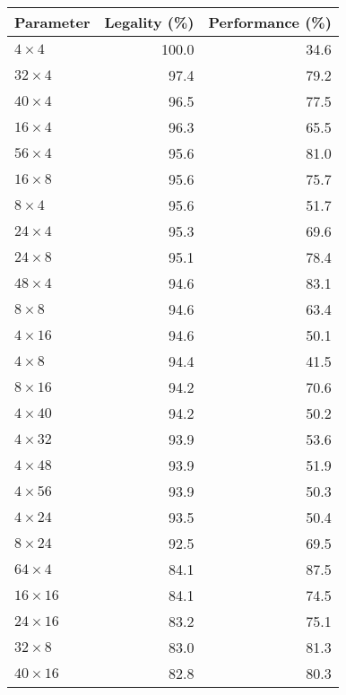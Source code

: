 \begin{tabular}{lrr}
  \toprule
  Parameter & Legality (\%) & Performance (\%) \\
  \midrule
  $4 \times 4$ & 100.0 & 34.6 \\
  $32 \times 4$ & 97.4 & 79.2 \\
  $40 \times 4$ & 96.5 & 77.5 \\
  $16 \times 4$ & 96.3 & 65.5 \\
  $56 \times 4$ & 95.6 & 81.0 \\
  $16 \times 8$ & 95.6 & 75.7 \\
  $8 \times 4$ & 95.6 & 51.7 \\
  $24 \times 4$ & 95.3 & 69.6 \\
  $24 \times 8$ & 95.1 & 78.4 \\
  $48 \times 4$ & 94.6 & 83.1 \\
  $8 \times 8$ & 94.6 & 63.4 \\
  $4 \times 16$ & 94.6 & 50.1 \\
  $4 \times 8$ & 94.4 & 41.5 \\
  $8 \times 16$ & 94.2 & 70.6 \\
  $4 \times 40$ & 94.2 & 50.2 \\
  $4 \times 32$ & 93.9 & 53.6 \\
  $4 \times 48$ & 93.9 & 51.9 \\
  $4 \times 56$ & 93.9 & 50.3 \\
  $4 \times 24$ & 93.5 & 50.4 \\
  $8 \times 24$ & 92.5 & 69.5 \\
  $64 \times 4$ & 84.1 & 87.5 \\
  $16 \times 16$ & 84.1 & 74.5 \\
  $24 \times 16$ & 83.2 & 75.1 \\
  $32 \times 8$ & 83.0 & 81.3 \\
  $40 \times 16$ & 82.8 & 80.3 \\
  \bottomrule
\end{tabular}

